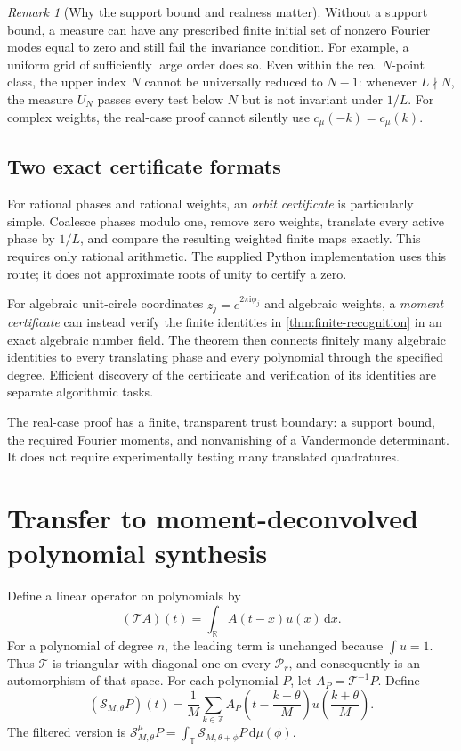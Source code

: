 \documentclass[11pt,a4paper]{article}
\numberwithin{equation}{section}
\theoremstyle{plain}
\theoremstyle{definition}
\theoremstyle{remark}
\newtheorem{remark}[theorem]{Remark}
\newcommand{\R}{\mathbb R}
\newcommand{\Z}{\mathbb Z}
\newcommand{\T}{\mathbb T}
\newcommand{\dd}{\,\mathrm d}
\newcommand{\ii}{\mathrm i}
\newcommand{\Poly}{\mathcal P}
\begin{document}
\begin{remark}[Why the support bound and realness matter]
Without a support bound, a measure can have any prescribed finite initial
set of nonzero Fourier modes equal to zero and still fail the invariance
condition. For example, a uniform grid of sufficiently large order does
so. Even within the real $N$-point class, the upper index $N$ cannot be
universally reduced to $N-1$: whenever $L\nmid N$, the measure $U_N$
passes every test below $N$ but is not invariant under $1/L$.
For complex weights, the real-case proof cannot silently use
$c_\mu(-k)=\overline{c_\mu(k)}$.
\end{remark}

\subsection{Two exact certificate formats}

For rational phases and rational weights, an \emph{orbit certificate} is
particularly simple. Coalesce phases modulo one, remove zero weights,
translate every active phase by $1/L$, and compare the resulting weighted
finite maps exactly. This requires only rational arithmetic. The supplied
Python implementation uses this route; it does not approximate roots of
unity to certify a zero.

For algebraic unit-circle coordinates $z_j=e^{2\pi\ii\phi_j}$ and
algebraic weights, a \emph{moment certificate} can instead verify the
finite identities in \cref{thm:finite-recognition} in an exact algebraic
number field. The theorem then connects finitely many algebraic
identities to every translating phase and every polynomial through the
specified degree. Efficient discovery of the certificate and verification
of its identities are separate algorithmic tasks.

The real-case proof has a finite, transparent trust boundary: a support
bound, the required Fourier moments, and nonvanishing of a Vandermonde
determinant. It does not require experimentally testing many translated
quadratures.

\section{Transfer to moment-deconvolved polynomial synthesis}
\label{sec:synthesis}

Define a linear operator on polynomials by
\begin{equation}\label{eq:Toperator}
 (\mathcal T A)(t)=\int_\R A(t-x)u(x)\dd x.
\end{equation}
For a polynomial of degree $n$, the leading term is unchanged because
$\int u=1$. Thus $\mathcal T$ is triangular with diagonal one on every
$\Poly_r$, and consequently is an automorphism of that space. For each
polynomial $P$, let $A_P=\mathcal T^{-1}P$. Define
\begin{equation}\label{eq:synthesis}
 (\mathcal S_{M,\theta}P)(t)=\frac1M\sum_{k\in\Z}
 A_P\!\left(t-\frac{k+\theta}{M}\right)
 u\!\left(\frac{k+\theta}{M}\right).
\end{equation}
The filtered version is
$\mathcal S^\mu_{M,\theta}P=\int_\T\mathcal S_{M,\theta+\phi}P\dd\mu(\phi)$.
\end{document}
